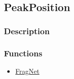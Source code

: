 \subsection{PeakPosition}\label{PeakPosition}
\subsubsection{Description}


\subsubsection{Functions}
\begin{itemize}
\item \hyperref[FragNet]{FragNet}
\end{itemize}

